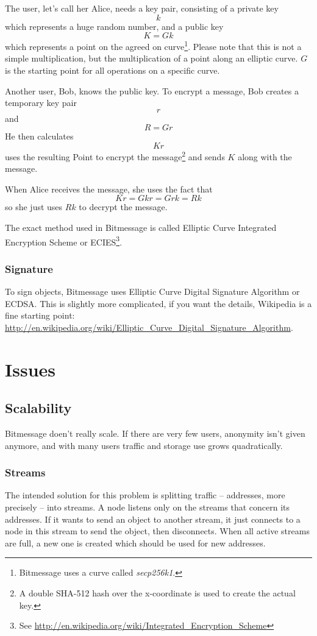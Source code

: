 \documentclass{bfh}
\begin{document}
  The user, let's call her Alice, needs a key pair, consisting of a private key
$$k$$
which represents a huge random number, and a public key
$$K = G k$$
which represents a point on the agreed on curve\footnote{Bitmessage uses a curve called \textit{secp256k1}.}. Please note that this is not a simple multiplication, but the multiplication of a point along an elliptic curve. $G$ is the starting point for all operations on a specific curve.

  Another user, Bob, knows the public key. To encrypt a message, Bob creates a temporary key pair
$$r$$
and
$$R = G r$$
He then calculates
$$K r$$
uses the resulting Point to encrypt the message\footnote{A double SHA-512 hash over the x-coordinate is used to create the actual key.} and sends $K$ along with the message.

  When Alice receives the message, she uses the fact that
$$K r = G k r = G r k = R k$$
so she just uses $R k$ to decrypt the message.

  The exact method used in Bitmessage is called Elliptic Curve Integrated Encryption Scheme or ECIES\footnote{See \url{http://en.wikipedia.org/wiki/Integrated_Encryption_Scheme}}.

  \subsubsection{Signature}

  To sign objects, Bitmessage uses Elliptic Curve Digital Signature Algorithm or ECDSA. This is slightly more complicated, if you want the details, Wikipedia is a fine starting point: \url{http://en.wikipedia.org/wiki/Elliptic_Curve_Digital_Signature_Algorithm}.

  \section{Issues}

  \subsection{Scalability}

  Bitmessage doen't really scale. If there are very few users, anonymity isn't given anymore, and with many users traffic and storage use grows quadratically.

  \subsubsection{Streams}
  The intended solution for this problem is splitting traffic -- addresses, more precisely -- into streams. A node listens only on the streams that concern its addresses. If it wants to send an object to another stream, it just connects to a node in this stream to send the object, then disconnects. When all active streams are full, a new one is created which should be used for new addresses.
\end{document}
